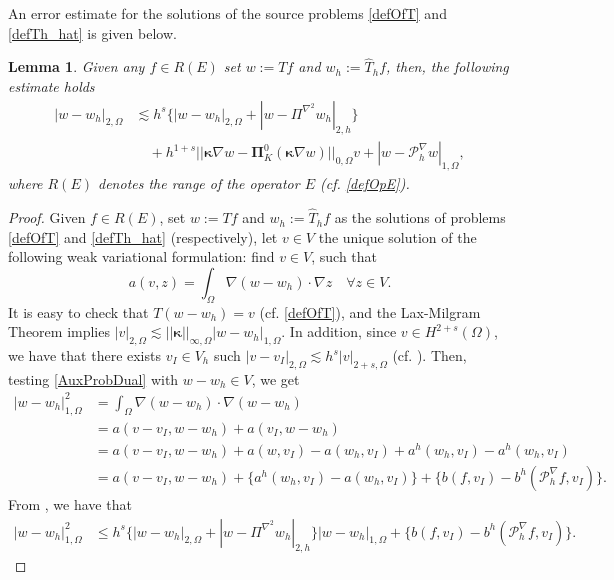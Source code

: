 \documentclass[final,reqno]{elsarticle}
\newtheorem{lemma}{Lemma}[section]
\def\bkappa{\boldsymbol{\kappa}}
\def\bPi{\mathbf{\Pi}}
\begin{document}
An error estimate for the solutions of the source problems \eqref{defOfT} and \eqref{defTh_hat} is given below.
\begin{lemma}\label{Lem10APVEP}
    Given any $f\in R(E)$ set $w:=Tf$ and $w_h:=\widehat{T}_hf$, then,  the following estimate holds
\begin{align}
|w-w_h|_{2,\Omega}
&\lesssim h^s\Big\{|w-w_h|_{2,\Omega} + |w-\Pi^{\nabla^2}w_h|_{2,h} \Big\} \nonumber\\
&\quad + h^{1+s}  ||\bkappa \nabla w - \bPi_K^0(\bkappa \nabla w)  ||_{0,\Omega} v  + |w-\mathcal{P}_h^\nabla w|_{1,\Omega}, \nonumber%
\end{align}
where $R(E)$ denotes the range of the operator $E$ (cf. \eqref{defOpE}).
\end{lemma}
\begin{proof}
Given $f\in R(E)$, set $w:=Tf$ and $w_h:=\widehat{T}_hf$ as the solutions of problems \eqref{defOfT} and  \eqref{defTh_hat} (respectively), let $v\in V$ the unique solution of the following weak  variational formulation: find $v\in V$, such that \begin{equation}\label{AuxProbDual}
    a(v,z)=\int_\Omega  \nabla(w-w_h)\cdot \nabla z\quad \forall z\in V. 
\end{equation} 
It is easy to check that $T(w-w_h)=v$ (cf. \eqref{defOfT}), and the Lax-Milgram Theorem implies $|v|_{2,\Omega}\lesssim ||\bkappa||_{\infty,\Omega}|w-w_h|_{1,\Omega}$. In addition, since $v\in H^{2+s}(\Omega)$, we have that there exists $v_I\in V_h$ such $|v-v_I|_{2,\Omega}\lesssim h^s |v|_{2+s,\Omega}$ (cf. \cite{G}). Then, testing \eqref{AuxProbDual} with $w-w_h\in V$, we get
\begin{align}
 |w-w_h|_{1,\Omega}^2&=   \int_\Omega  \nabla(w-w_h)\cdot \nabla (w-w_h)\nonumber\\%
 &=a(v-v_I,w-w_h)+a(v_I,w-w_h)\nonumber\\
 &=  a(v-v_I,w-w_h)+a(w,v_I) - a(w_h,v_I) +  a^h(w_h,v_I)- a^h(w_h,v_I)\nonumber\\
 &=  a(v-v_I,w-w_h) + \{ a^h(w_h,v_I) -  a(w_h,v_I)\} +\{ b(f,v_I) -b^h(\mathcal{P}_h^\nabla f,v_I)\} .\nonumber 
\end{align}
From \cite[Lemma~10]{dassi2025posteriorierrorestimatesc1}, we have that
\begin{align}
 |w-w_h|_{1,\Omega}^2 &\leq h^s\Big\{|w-w_h|_{2,\Omega} + |w-\Pi^{\nabla^2}w_h|_{2,h}\Big\}|w-w_h|_{1,\Omega}  + \big\{ b(f,v_I) - b^h(\mathcal{P}_h^{\nabla} f,v_I)\big\} .\label{aux0_teo10}
\end{align}


\end{proof}
\end{document}
